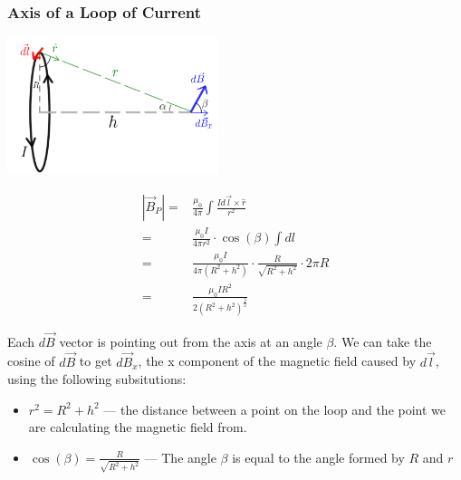 \documentclass[12pt, titlepage]{article}
\begin{document}
\subsubsection*{Axis of a Loop of Current}

\begin{center}
    \includegraphics*[height=4cm]{media/axis.png}
\end{center}

\begin{align*}
    |\vec{B}_P| =& \frac{\mu_0}{4\pi} \int \frac{Id\vec{l}\times\hat{r}}{r^2} \\
    =& \frac{\mu_0I}{4 \pi r^2} \cdot \cos(\beta)\int dl \\
    =& \frac{\mu_0I}{4 \pi (R^2+h^2)} \cdot \frac{R}{\sqrt{R^2+h^2}} \cdot 2 \pi R \\
    =& \boxed{\frac{\mu_0 IR^2}{2(R^2+h^2)^\frac{3}{2}}}
\end{align*}

Each $d\vec{B}$ vector is pointing out from the axis at an angle $\beta$. We can take the cosine of $d\vec{B}$ to get $d\vec{B}_x$, the x component of the magnetic field caused by $d\vec{l}$, using the following subsitutions:
\begin{itemize}
    \item $r^2=R^2+h^2$ --- the distance between a point on the loop and the point we are calculating the magnetic field from.
    \item $\cos (\beta) = \frac{R}{\sqrt{R^2+h^2}}$ --- The angle $\beta$ is equal to the angle formed by $R$ and $r$ 
\end{itemize}
\end{document}
